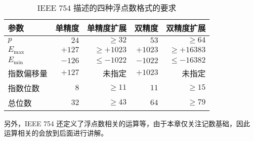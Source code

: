             \begin{table}
                \centering
                \begin{tabular}{lrrrr}
                    参数       & 单精度 &        单精度扩展 &  双精度 &         双精度扩展 \\ \hline
                    $p$        &   $24$ &    $\geqslant 32$ &    $53$ &     $\geqslant 64$ \\
                    $E_{\max}$ & $+127$ & $\geqslant +1023$ & $+1023$ & $\geqslant +16383$ \\
                    $E_{\min}$ & $-126$ & $\leqslant -1022$ & $-1022$ & $\leqslant -16382$ \\
                    指数偏移量 & $+127$ &            未指定 & $+1023$ &             未指定 \\
                    指数位数   &    $8$ &    $\geqslant 11$ &    $11$ &     $\geqslant 15$ \\
                    总位数     &   $32$ &    $\geqslant 43$ &    $64$ &     $\geqslant 79$
                \end{tabular}
                \caption{IEEE 754 描述的四种浮点数格式的要求}
                \label{tab:NumberSystemBasics/FloatingPointNotations/IEEE754/ExtendedFormats/Requirements}
            \end{table}

        另外，IEEE 754 还定义了浮点数相关的运算等，由于本章仅关注记数基础，因此运算相关的会放到后面进行讲解。
